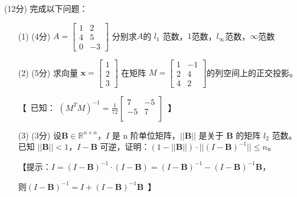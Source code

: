 \documentclass[12pt,a4paper,openany,twoside]{ctexbook}
\begin{document}
\begin{exercise}\quad(12分)
	完成以下问题：
	
	\begin{itemize}
		\item [(1)](4分) $A=\begin{bmatrix}  
			1 & 2 \\  
			4 & 5 \\
			0 & -3 
			\end{bmatrix}$ 分别求$A$的 $l_1$ 范数，$1$范数，$l_{\infty}$范数，$\infty$范数
		\item [(2)](5分) 求向量 $\mathbf{x}=\begin{bmatrix}  
			1  \\  
			2 \\
			3 
			\end{bmatrix}$ 在矩阵 $M=\begin{bmatrix}  
			1 & -1 \\  
			2 & 4 \\
			4 & 2 
			\end{bmatrix}$的列空间上的正交投影。

			【\ 已知： $(M^TM)^{-1}=\frac{1}{72}\begin{bmatrix}  
				7 & -5 \\  
				-5 & 7 \\ 
				\end{bmatrix} $\ 】

		\item [(3)](3分) 设$\mathbf{B} \in \mathbb{R}^{n \times n}$，$I$ 是 n 阶单位矩阵，$||\mathbf{B}||$ 是关于 $\mathbf{B}$ 的矩阵 $l_2$ 范数。已知 $||\mathbf{B}|| < 1$，$I-\mathbf{B}$ 可逆，证明：$(1-||\mathbf{B}||)·||(I-\mathbf{B})^{-1}|| \leq n$。

		【提示：$I=(I-\mathbf{B})^{-1}·(I-\mathbf{B})=(I-\mathbf{B})^{-1}-(I-\mathbf{B})^{-1}\mathbf{B}$，
		
		则$(I-\mathbf{B})^{-1}=I+(I-\mathbf{B})^{-1}\mathbf{B}$\ 】
	\end{itemize}
	
\end{exercise}
\end{document}
